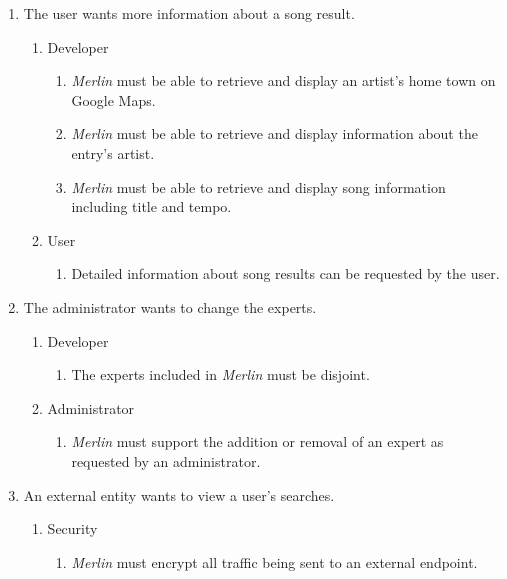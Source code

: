 \documentclass[]{article}
\newcommand{\merlin}{\textit{Merlin }}
\begin{document}
\begin{enumerate}[{BE}1.]
\begin{enumerate}[{VP2}.1]
	\end{enumerate}
	\item The user wants more information about a song result.
	\begin{enumerate}[{VP3}.1]
		\item Developer
			\begin{enumerate}
				\item \merlin must be able to retrieve and display an artist's home town on Google Maps. 
				\item \merlin must be able to retrieve and display information about the entry's artist.
				\item \merlin must be able to retrieve and display song information including title and tempo.
			\end{enumerate}
		\item User
			\begin{enumerate}
				\item Detailed information about song results can be requested by the user.
			\end{enumerate}
	\end{enumerate}
	\item The administrator wants to change the experts.
	\begin{enumerate}[{VP4}.1]
		\item Developer
			\begin{enumerate}
				\item The experts included in \merlin must be disjoint.
			\end{enumerate}
		\item Administrator
			\begin{enumerate}
				\item \merlin must support the addition or removal of an expert as requested by an administrator.
			\end{enumerate}
	\end{enumerate}
	\item An external entity wants to view a user's searches.
	\begin{enumerate}[{VP5}.1]
		\item Security
			\begin{enumerate}
				\item \merlin must encrypt all traffic being sent to an external endpoint.
			\end{enumerate}
	\end{enumerate}
\end{enumerate}
\cbend
\end{document}

